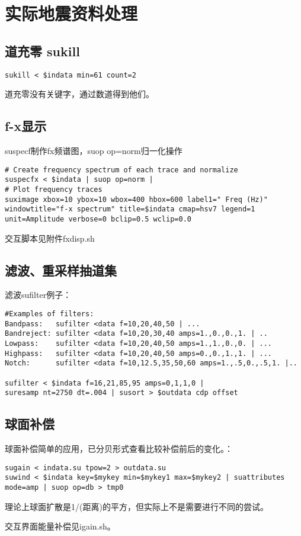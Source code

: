 \chapter{实际地震资料处理}

\section{道充零 sukill} 
\begin{lstlisting}
sukill < $indata min=61 count=2
\end{lstlisting}
道充零没有关键字，通过数道得到他们。

\section{f-x显示}
suspecf制作fx频谱图，suop op=norm归一化操作
\begin{lstlisting}
# Create frequency spectrum of each trace and normalize
suspecfx < $indata | suop op=norm |
# Plot frequency traces
suximage xbox=10 ybox=10 wbox=400 hbox=600 label1=" Freq (Hz)" windowtitle="f-x spectrum" title=$indata cmap=hsv7 legend=1 unit=Amplitude verbose=0 bclip=0.5 wclip=0.0 
\end{lstlisting}
交互脚本见附件fxdisp.sh

\section{滤波、重采样抽道集}
滤波sufilter例子：
\begin{lstlisting}
#Examples of filters:							
Bandpass:   sufilter <data f=10,20,40,50 | ...			
Bandreject: sufilter <data f=10,20,30,40 amps=1.,0.,0.,1. | ..	
Lowpass:    sufilter <data f=10,20,40,50 amps=1.,1.,0.,0. | ...	
Highpass:   sufilter <data f=10,20,40,50 amps=0.,0.,1.,1. | ...	
Notch:      sufilter <data f=10,12.5,35,50,60 amps=1.,.5,0.,.5,1. |..	

sufilter < $indata f=16,21,85,95 amps=0,1,1,0 | 
suresamp nt=2750 dt=.004 | susort > $outdata cdp offset
\end{lstlisting}

\section{球面补偿}
球面补偿简单的应用，已分贝形式查看比较补偿前后的变化。：
\begin{lstlisting}
sugain < indata.su tpow=2 > outdata.su
suwind < $indata key=$mykey min=$mykey1 max=$mykey2 | suattributes mode=amp | suop op=db > tmp0
\end{lstlisting}
\par
理论上球面扩散是1/(距离)的平方，但实际上不是需要进行不同的尝试。\par
交互界面能量补偿见igain.sh。\par

